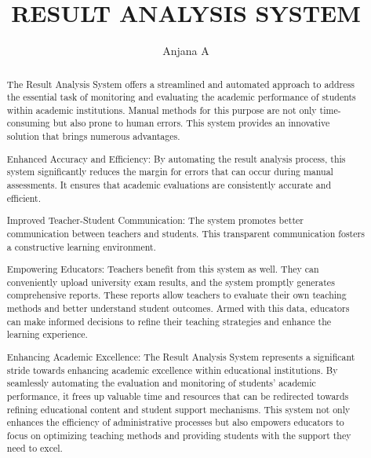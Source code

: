 \documentclass{nascproject}
\title{RESULT ANALYSIS SYSTEM}
\author{Anjana A}
\begin{document}
\lstset{
	basicstyle=\ttfamily\footnotesize,
	breakatwhitespace=false,         
	breaklines=true,                 
	keepspaces=true,                 
	numbers=none,                    
	numbersep=5pt,                  
	showspaces=false,                
	showstringspaces=false,
	showtabs=false,                  
	tabsize=2,
	upquote=true,
}
\maketitle

\makecert

\newpage
\setcounter{page}{1}
\renewcommand\abstractname{ABSTRACT}
\begin{abstract}
The Result Analysis System offers a streamlined and automated approach to address the essential task of monitoring and evaluating the academic performance of students within academic institutions. Manual methods for this purpose are not only time-consuming but also prone to human errors. This system provides an innovative solution that brings numerous advantages.

Enhanced Accuracy and Efficiency: By automating the result analysis process, this system significantly reduces the margin for errors that can occur during manual assessments. It ensures that academic evaluations are consistently accurate and efficient.

Improved Teacher-Student Communication: The system promotes better communication between teachers and students. This transparent communication fosters a constructive learning environment.

Empowering Educators: Teachers benefit from this system as well. They can conveniently upload university exam results, and the system promptly generates comprehensive reports. These reports allow teachers to evaluate their own teaching methods and better understand student outcomes. Armed with this data, educators can make informed decisions to refine their teaching strategies and enhance the learning experience.

Enhancing Academic Excellence: The Result Analysis System represents a significant stride towards enhancing academic excellence within educational institutions. By seamlessly automating the evaluation and monitoring of students' academic performance, it frees up valuable time and resources that can be redirected towards refining educational content and student support mechanisms. This system not only enhances the efficiency of administrative processes but also empowers educators to focus on optimizing teaching methods and providing students with the support they need to excel.



\end{abstract}
\end{document}
